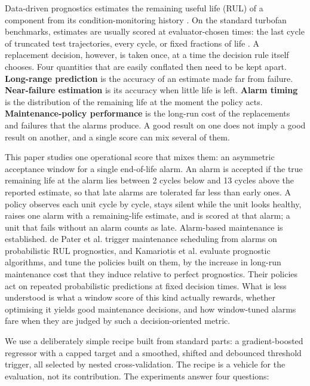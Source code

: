 \documentclass[a4paper,fleqn,doubleblind]{cas-dc}
\begin{document}
Data-driven prognostics estimates the remaining useful life (RUL) of a component from its condition-monitoring history \cite{lei2018,si2011}. On the standard turbofan benchmarks, estimates are usually scored at evaluator-chosen times: the last cycle of truncated test trajectories, every cycle, or fixed fractions of life \cite{ramasso2014}. A replacement decision, however, is taken once, at a time the decision rule itself chooses. Four quantities that are easily conflated then need to be kept apart. \textbf{Long-range prediction} is the accuracy of an estimate made far from failure. \textbf{Near-failure estimation} is its accuracy when little life is left. \textbf{Alarm timing} is the distribution of the remaining life at the moment the policy acts. \textbf{Maintenance-policy performance} is the long-run cost of the replacements and failures that the alarms produce. A good result on one does not imply a good result on another, and a single score can mix several of them.

This paper studies one operational score that mixes them: an asymmetric acceptance window for a single end-of-life alarm. An alarm is accepted if the true remaining life at the alarm lies between 2 cycles below and 13 cycles above the reported estimate, so that late alarms are tolerated far less than early ones. A policy observes each unit cycle by cycle, stays silent while the unit looks healthy, raises one alarm with a remaining-life estimate, and is scored at that alarm; a unit that fails without an alarm counts as late. Alarm-based maintenance is established. de Pater et al. \cite{depater2022} trigger maintenance scheduling from alarms on probabilistic RUL prognostics, and Kamariotis et al. \cite{kamariotis2024} evaluate prognostic algorithms, and tune the policies built on them, by the increase in long-run maintenance cost that they induce relative to perfect prognostics. Their policies act on repeated probabilistic predictions at fixed decision times. What is less understood is what a window score of this kind actually rewards, whether optimising it yields good maintenance decisions, and how window-tuned alarms fare when they are judged by such a decision-oriented metric.

We use a deliberately simple recipe built from standard parts: a gradient-boosted regressor with a capped target and a smoothed, shifted and debounced threshold trigger, all selected by nested cross-validation. The recipe is a vehicle for the evaluation, not its contribution. The experiments answer four questions:
\end{document}
